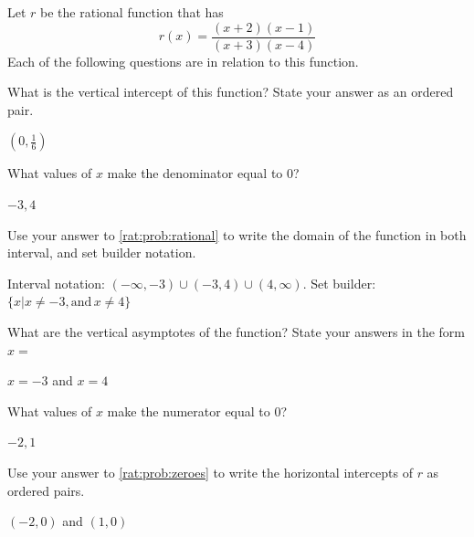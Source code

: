 \begin{exercises}
	 \begin{problem}
	 Let $r$ be the rational function that has
	 \[
		 r(x) = \frac{(x+2)(x-1)}{(x+3)(x-4)}
	 \]
	 Each of the following questions are in relation to this function.
	 \begin{subproblem}
		 What is the vertical intercept of this function? State your answer as an
		 ordered pair. 
		 \begin{shortsolution}
			 $\left(0,\frac{1}{6}\right)$
		 \end{shortsolution}
	 \end{subproblem}
	 \begin{subproblem}\label{rat:prob:rational}
		 What values of $x$ make the denominator equal to $0$?
		 \begin{shortsolution}
			 $-3,4$
		 \end{shortsolution}
	 \end{subproblem}
	 \begin{subproblem}
		 Use your answer to \cref{rat:prob:rational} to write the domain of the function in
		 both interval, and set builder notation. %
		 \begin{shortsolution}
			 Interval notation: $(-\infty,-3)\cup (-3,4)\cup (4,\infty)$.
			 Set builder: $\{x|x\ne -3, \mathrm{and}\, x\ne 4\}$
		 \end{shortsolution}
	 \end{subproblem}
	 \begin{subproblem}
		 What are the vertical asymptotes of the function? State your answers in
		 the form $x=$
		 \begin{shortsolution}
			 $x=-3$ and $x=4$
		 \end{shortsolution}
	 \end{subproblem}
	 \begin{subproblem}\label{rat:prob:zeroes}
		 What values of $x$ make the numerator equal to $0$?
		 \begin{shortsolution}
			 $-2,1$
		 \end{shortsolution}
	 \end{subproblem}
	 \begin{subproblem}
		 Use your answer to \cref{rat:prob:zeroes} to write the horizontal intercepts of
		 $r$ as ordered pairs.
		 \begin{shortsolution}
			 $(-2,0)$ and $(1,0)$
		 \end{shortsolution}
	 \end{subproblem}
	 \end{problem}



\end{exercises}
